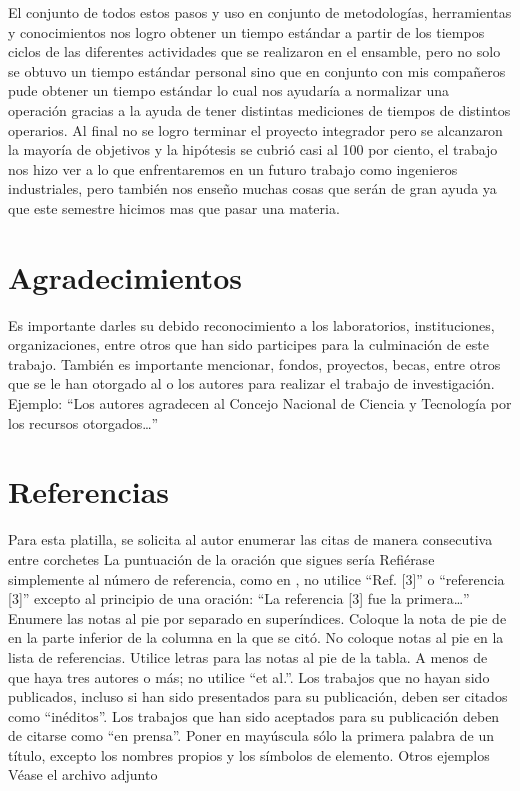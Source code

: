     El conjunto de todos estos pasos y uso en conjunto de metodologías, herramientas y conocimientos nos logro obtener un tiempo estándar a partir de los tiempos ciclos de las diferentes actividades que se realizaron en el ensamble, pero no solo se obtuvo un tiempo estándar personal sino que en conjunto con mis compañeros pude obtener un tiempo estándar lo cual nos ayudaría a normalizar una operación gracias a la ayuda de tener distintas mediciones de tiempos de distintos operarios.
    Al final no se logro terminar el proyecto integrador pero se alcanzaron la mayoría de objetivos y la hipótesis se cubrió casi al 100 por ciento, el trabajo nos hizo ver a lo que enfrentaremos en un futuro trabajo como ingenieros industriales, pero también nos enseño muchas cosas que serán de gran ayuda ya que este semestre hicimos mas que pasar una materia.
    
    \section{Agradecimientos}
    
    Es importante darles su debido reconocimiento a los laboratorios, instituciones, organizaciones, entre otros que han sido participes para la culminación de este trabajo. También es importante mencionar, fondos, proyectos, becas, entre otros que se le han otorgado al o los autores para realizar el trabajo de investigación. Ejemplo: “Los autores agradecen al Concejo Nacional de Ciencia y Tecnología por los recursos otorgados…”
    
    \section*{Referencias}
    Para esta platilla, se solicita al autor enumerar las citas de manera consecutiva entre corchetes 
    La puntuación de la oración que sigues sería  
    Refiérase simplemente al número de referencia, como en , no utilice “Ref. [3]” o “referencia [3]” excepto al principio de una oración: “La referencia [3] fue la primera…”
    Enumere las notas al pie por separado en superíndices. Coloque la nota de pie de en la parte inferior de la columna en la que se citó. No coloque notas al pie en la lista de referencias. Utilice letras para las notas al pie de la tabla.
    A menos de que haya tres autores o más; no utilice “et al.”. Los trabajos que no hayan sido publicados, incluso si han sido presentados para su publicación, deben ser citados como “inéditos”. Los trabajos que han sido aceptados para su publicación deben de citarse como “en prensa”. Poner en mayúscula sólo la primera palabra de un título, excepto los nombres propios y los símbolos de elemento. 
    Otros ejemplos 
    Véase el archivo adjunto 
    
